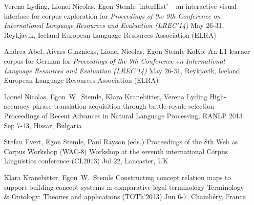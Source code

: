 \documentclass[11pt,a4paper]{moderncv}
\begin{document}
        {Verena Lyding, Lionel Nicolas, Egon Stemle}
        {\small 'interHist' -- an interactive visual interface for corpus exploration}
        {\small for {\em Proceedings of the 9th Conference on International
        Language Resources and Evaluation (LREC'14)}}
        {\small May 26-31, Reykjavik, Iceland}
        {\small European Language Resources Association (ELRA)}

        {Andrea Abel, Aivars Glaznieks, Lionel Nicolas, Egon Stemle}
        {\small KoKo: An L1 learner corpus for German}
        {\small for {\em Proceedings of the 9th Conference on International
        Language Resources and Evaluation (LREC'14)}}
        {\small May 26-31, Reykjavik, Iceland}
        {\small European Language Resources Association (ELRA)}

        {Lionel Nicolas, Egon~W.~Stemle, Klara Kranebitter, Verena Lyding}
        {\small High-accuracy phrase translation acquisition through
        battle-royale selection}
        {\small Proceedings of Recent Advances in Natural Language Processing,
        RANLP 2013}
        {\small Sep 7-13, Hissar, Bulgaria}
        {}


        {Stefan Evert, Egon Stemle, Paul Rayson (eds.)}
        {\small Proceedings of the 8th Web as Corpus Workshop (WAC-8)}
        {\small Workshop at the seventh international Corpus Linguistics conference (CL2013)}
        {\small Jul 22, Lancaster, UK}
        {}


        {Klara Kranebitter, Egon~W.~Stemle}
        {\small Constructing concept relation maps to support building concept
        systems in comparative legal terminology}
        {\small Terminology \& Ontology: Theories and applications (TOTh'2013)}
        {\small Jun 6-7, Chamb\'{e}ry, France}
        {}
\end{document}
